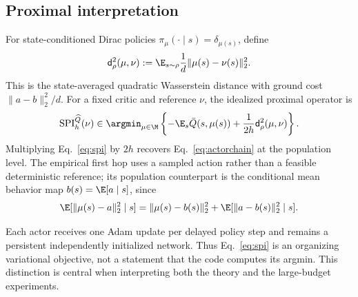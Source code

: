 \subsection{Proximal interpretation}

For state-conditioned Dirac policies $\pi_\mu(\cdot\mid s)=\delta_{\mu(s)}$, define
\begin{equation}
 \mathsf d_{\rho}^2(\mu,\nu)
 :=\E_{s\sim\rho}\frac{1}{d}\|\mu(s)-\nu(s)\|_2^2.              \label{eq:fiber_metric}
\end{equation}
This is the state-averaged quadratic Wasserstein distance with ground cost $\|a-b\|_2^2/d$. For a fixed critic and reference $\nu$, the idealized proximal operator is
\begin{equation}
 \operatorname{SPI}_{h}^{\widehat Q}(\nu)
 \in\argmin_{\mu\in\M}
 \left\{-\E_s\bar Q(s,\mu(s))
 +\frac{1}{2h}\mathsf d_{\rho}^2(\mu,\nu)\right\}.             \label{eq:spi}
\end{equation}
Multiplying Eq.~\eqref{eq:spi} by $2h$ recovers Eq.~\eqref{eq:actorchain} at the population level. The empirical first hop uses a sampled action rather than a feasible deterministic reference; its population counterpart is the conditional mean behavior map $b(s)=\E[a\mid s]$, since
\begin{equation}
 \E[\|\mu(s)-a\|_2^2\mid s]
 =\|\mu(s)-b(s)\|_2^2+\E[\|a-b(s)\|_2^2\mid s].               \label{eq:biasvariance}
\end{equation}

\begin{remark}
Each actor receives one Adam update per delayed policy step and remains a persistent independently initialized network. Thus Eq.~\eqref{eq:spi} is an organizing variational objective, not a statement that the code computes its argmin. This distinction is central when interpreting both the theory and the large-budget experiments.
\end{remark}
